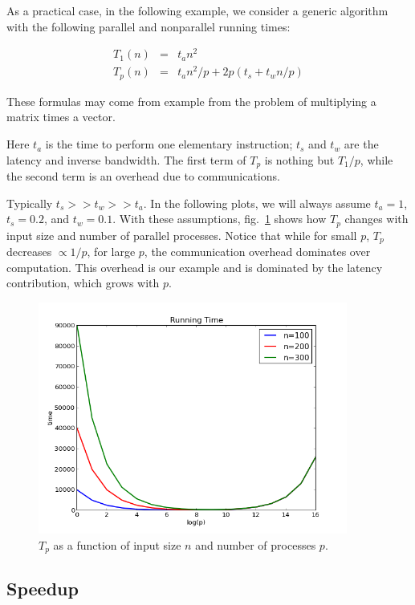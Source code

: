 \documentclass[justified,sixbynine]{tufte-book}
\theoremstyle{plain}%
\theoremstyle{definition}
\theoremstyle{remark}
\begin{document}
\begin{fullwidth}
As a practical case, in the following example, we consider a generic algorithm with the following parallel and nonparallel running times:

\begin{eqnarray}
T_1(n) &=& t_a n^2 \\
T_p(n) &=& t_a n^2 / p + 2p (t_s+t_w n/p)
\end{eqnarray}

These formulas may come from example from the problem of multiplying a matrix times a vector.

Here $t_a$ is the time to perform one elementary instruction; $t_s$ and $t_w$ are the latency and inverse bandwidth. The first term of $T_p$ is nothing but $T_1/p$, while the second term is an overhead due to communications.

Typically $t_s >> t_w >> t_a$. In the following plots, we will always assume $t_a=1$, $t_s=0.2$, and $t_w=0.1$. With these assumptions, fig.~\ref{Tp} shows how $T_p$ changes with input size and number of parallel processes. Notice that while for small $p$, $T_p$ decreases $\propto 1/p$, for large $p$, the communication overhead dominates over computation. This overhead is our example and is dominated by the latency contribution, which grows with $p$.

\begin{figure}[ht]
\centering\includegraphics[width=4in]{images/Tp.png}
\caption{$T_p$ as a function of input size $n$ and number of processes $p$.\label{Tp}}
\end{figure}

\goodbreak\subsection{Speedup}


\end{fullwidth}
\end{document}
